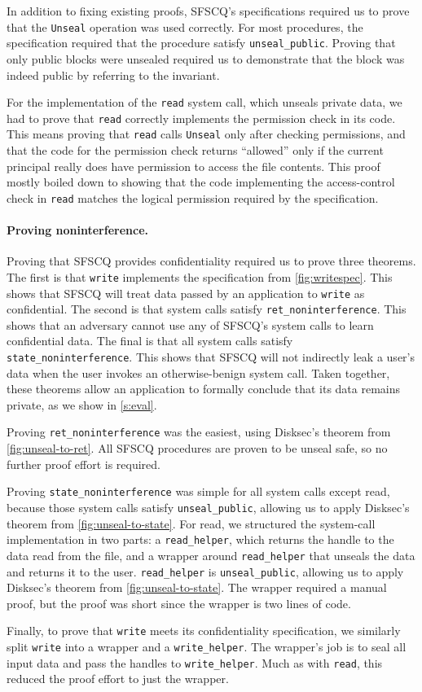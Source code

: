 In addition to fixing existing proofs, SFSCQ's specifications required us to prove that
the \texttt{Unseal} operation was used correctly.  For most procedures, the
specification required that the procedure satisfy \texttt{unseal\_public}.
Proving that only public blocks were unsealed required us to demonstrate
that the block was indeed public by referring to the invariant.

For the implementation of the \texttt{read} system call, which unseals private
data, we had to prove that \texttt{read} correctly implements the permission
check in its code.  This means proving that \texttt{read} calls \texttt{Unseal}
only after checking permissions, and that the code for the permission
check returns ``allowed'' only if the current principal really does have
permission to access the file contents.  This proof mostly boiled down to
showing that the code implementing the access-control check in \texttt{read}
matches the logical permission required by the specification.


\paragraph{Proving noninterference.}

Proving that SFSCQ provides confidentiality required us to
prove three theorems.  The first is that \texttt{write} implements the
specification from \ref{fig:writespec}.  This shows that SFSCQ
will treat data passed by an application to \texttt{write} as confidential.
The second is that system calls satisfy \texttt{ret\_noninterference}.
This shows that an adversary cannot use any of SFSCQ's system calls
to learn confidential data.  The final is that all system calls satisfy
\texttt{state\_noninterference}.  This shows that SFSCQ will not indirectly
leak a user's data when the user invokes an otherwise-benign
system call.  Taken together, these theorems allow an application to
formally conclude that its data remains private, as we show in
\ref{s:eval}.

Proving \texttt{ret\_noninterference} was the easiest, using Disksec's theorem
from \ref{fig:unseal-to-ret}.  All SFSCQ procedures are proven to be
unseal safe, so no further proof effort is required.

Proving \texttt{state\_noninterference} was simple for all system
calls except {read}, because those system calls satisfy \texttt{unseal\_public},
allowing us to apply Disksec's theorem from \ref{fig:unseal-to-state}.
For {read}, we structured the system-call implementation in two parts:
a \texttt{read\_helper}, which returns the handle to the data read from
the file, and a wrapper around \texttt{read\_helper} that unseals the data
and returns it to the user.  \texttt{read\_helper} is \texttt{unseal\_public},
allowing us to apply Disksec's theorem from \ref{fig:unseal-to-state}.
The wrapper required a manual proof, but the proof was short since the
wrapper is two lines of code.

Finally, to prove that \texttt{write} meets its confidentiality specification,
we similarly split \texttt{write} into a wrapper and a \texttt{write\_helper}.
The wrapper's job is to seal all input data and pass the handles to
\texttt{write\_helper}.  Much as with \texttt{read}, this reduced the proof effort
to just the wrapper.
